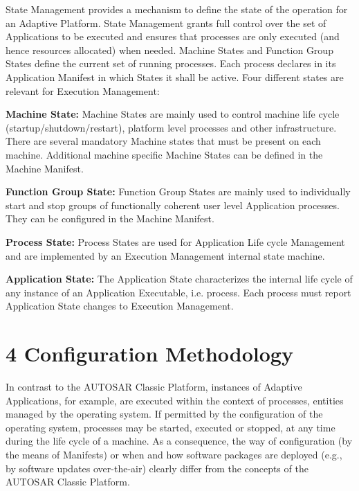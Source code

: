 State Management provides a mechanism to define the state of the operation for an Adaptive Platform. State Management grants full control over the set of Applications to be executed and ensures that processes are only executed (and hence resources allocated) when needed. Machine States and Function Group States define the current set of running processes. Each process declares in its Application Manifest in which States it shall be active.  Four different states are relevant for Execution Management\+:
\begin{DoxyItemize}
\item {\bfseries Machine State\+:} Machine States are mainly used to control machine life cycle (startup/shutdown/restart), platform level processes and other infrastructure. There are several mandatory Machine states that must be present on each machine. Additional machine specific Machine States can be defined in the Machine Manifest.
\item {\bfseries Function Group State\+:} Function Group States are mainly used to individually start and stop groups of functionally coherent user level Application processes. They can be configured in the Machine Manifest.
\item {\bfseries Process State\+:} Process States are used for Application Life cycle Management and are implemented by an Execution Management internal state machine.
\item {\bfseries Application State\+:} The Application State characterizes the internal life cycle of any instance of an Application Executable, i.\+e. process. Each process must report Application State changes to Execution Management.
\end{DoxyItemize}

\section*{4 Configuration Methodology}

In contrast to the A\+U\+T\+O\+S\+AR Classic Platform, instances of Adaptive Applications, for example, are executed within the context of processes, entities managed by the operating system. If permitted by the configuration of the operating system, processes may be started, executed or stopped, at any time during the life cycle of a machine. As a consequence, the way of configuration (by the means of Manifests) or when and how software packages are deployed (e.\+g., by software updates over-\/the-\/air) clearly differ from the concepts of the A\+U\+T\+O\+S\+AR Classic Platform.

